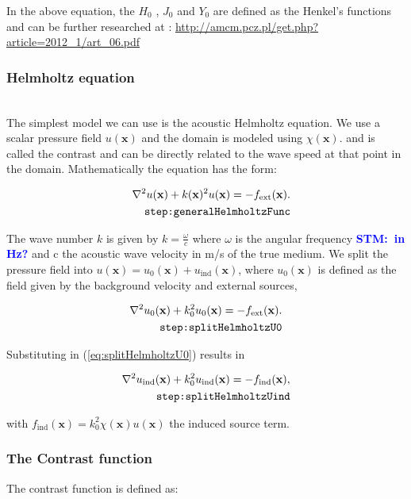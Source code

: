 \documentclass[10pt,a4paper]{article}
\newcommand{\commentstm}[1]{\textcolor{blue}{\textbf{STM:\ #1}}}
\newcommand{\oldstmtwo}[1]{\xout{#1}}
\begin{document}
In the above equation, the $H_0$ , $J_0$ and $Y_0$ are defined as the
Henkel's functions and can be further researched at :
\url{http://amcm.pcz.pl/get.php?article=2012_1/art_06.pdf}

\subsubsection{Helmholtz equation}
\oldstmtwo{\textbf{2.2 Helmholtz equation}}\\
The simplest model we can use is the acoustic Helmholtz equation. We
use a scalar pressure field $u(\mathbf{x})$ and the domain is modeled
using $\chi(\mathbf{x})$. and is called the contrast and can be
directly related to the wave speed at that point in the domain.
Mathematically the equation has the form:

\begin{align} \label{eq:generalHelmholtzFunc}
\nabla^2 u(\mathbf{x}) + k(\mathbf{x})^2 u(\mathbf{x}) =
-f_{\text{ext}}(\mathbf{x}).\\
\tag*{\texttt{step:generalHelmholtzFunc}}
\end{align}

The wave number $k$ is given by $k = \frac{\omega}{c}$ where $\omega$
is the angular frequency \commentstm{in Hz?} and c the
acoustic wave velocity in m/s of the true medium.
We split the pressure field into $u(\mathbf{x}) = u_0(\mathbf{x}) +
u_{\text{ind}}(\mathbf{x})$, where $u_0(\mathbf{x})$ is defined as the
field given by the background velocity and external sources,

\begin{align} \label{eq:splitHelmholtzU0}
\nabla^2 u_0(\mathbf{x}) + k_0^2 u_0(\mathbf{x}) = -f_{\text{ext}}(\mathbf{x}).\\
\tag*{\texttt{step:splitHelmholtzU0}}
\end{align}

Substituting in (\ref{eq:splitHelmholtzU0}) results in

\begin{align} \label{eq:splitHelmholtzUind}
\nabla^2 u_\text{ind}(\mathbf{x}) + k_0^2 u_\text{ind}(\mathbf{x}) =
-f_\text{ind}(\mathbf{x}),\\
\tag*{\texttt{step:splitHelmholtzUind}}
\end{align}

with $f_\text{ind}(\mathbf{x}) = k_0^2 \chi(\mathbf{x}) u(\mathbf{x})$
the induced source term.


\subsubsection{The Contrast function}
The contrast function is defined as:
\end{document}

